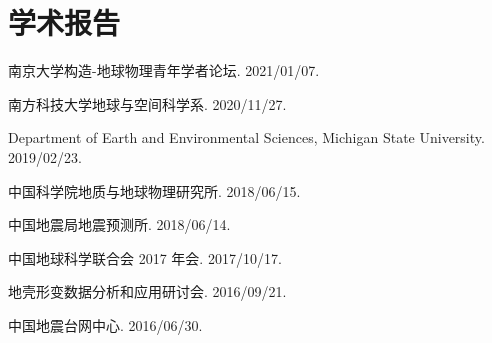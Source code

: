 \section*{学术报告}
\begin{etaremune}
\item
	南京大学构造-地球物理青年学者论坛. 2021/01/07.
\item
	南方科技大学地球与空间科学系. 2020/11/27. \invited
\item
    Department of Earth and Environmental Sciences, Michigan State University.
    2019/02/23.
\item
	中国科学院地质与地球物理研究所. 2018/06/15. \invited
\item
	中国地震局地震预测所. 2018/06/14.
\item
	中国地球科学联合会 2017 年会. 2017/10/17. \invited
\item
	地壳形变数据分析和应用研讨会. 2016/09/21. \invited
\item
	中国地震台网中心. 2016/06/30. \invited
\end{etaremune}
